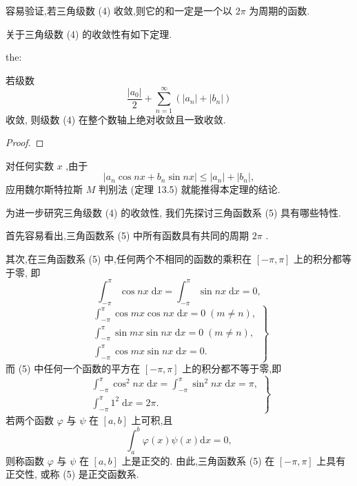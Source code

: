 容易验证,若三角级数 (4) 收敛,则它的和一定是一个以 \({2\pi }\) 为周期的函数.

关于三角级数 (4) 的收敛性有如下定理.

\begin{theorem}{}{the:}

\end{theorem}
 若级数
\[
\frac{\left| {a}_{0}\right| }{2} + \mathop{\sum }\limits_{{n = 1}}^{\infty }\left( {\left| {a}_{n}\right|  + \left| {b}_{n}\right| }\right)
\]
收敛, 则级数 (4) 在整个数轴上绝对收敛且一致收敛.

\begin{proof}

\end{proof}
对任何实数 \(x\) ,由于
\[
\left| {{a}_{n}\cos {nx} + {b}_{n}\sin {nx}}\right|  \leq  \left| {a}_{n}\right|  + \left| {b}_{n}\right| ,
\]
应用魏尔斯特拉斯 \(M\) 判别法 (定理 13.5) 就能推得本定理的结论.

为进一步研究三角级数 (4) 的收敛性, 我们先探讨三角函数系 (5) 具有哪些特性.

首先容易看出,三角函数系 (5) 中所有函数具有共同的周期 \({2\pi }\) .

其次,在三角函数系 (5) 中,任何两个不相同的函数的乘积在 \(\left\lbrack  {-\pi ,\pi }\right\rbrack\) 上的积分都等于零, 即
\[
{\int }_{-\pi }^{\pi }\cos {nx}\mathrm{\;d}x = {\int }_{-\pi }^{\pi }\sin {nx}\mathrm{\;d}x = 0, \tag{6}
\]
\[
\left. \begin{array}{l} {\int }_{-\pi }^{\pi }\cos {mx}\cos {nx}\mathrm{\;d}x = 0\;\left( {m \neq  n}\right) , \\  {\int }_{-\pi }^{\pi }\sin {mx}\sin {nx}\mathrm{\;d}x = 0\;\left( {m \neq  n}\right) , \\  {\int }_{-\pi }^{\pi }\cos {mx}\sin {nx}\mathrm{\;d}x = 0. \end{array}\right\}   \tag{7}
\]
而 (5) 中任何一个函数的平方在 \(\left\lbrack  {-\pi ,\pi }\right\rbrack\) 上的积分都不等于零,即
\[
\left. \begin{array}{l} {\int }_{-\pi }^{\pi }{\cos }^{2}{nx}\mathrm{\;d}x = {\int }_{-\pi }^{\pi }{\sin }^{2}{nx}\mathrm{\;d}x = \pi , \\  {\int }_{-\pi }^{\pi }{1}^{2}\mathrm{\;d}x = {2\pi }. \end{array}\right\}   \tag{8}
\]
若两个函数 \(\varphi\) 与 \(\psi\) 在 \(\left\lbrack  {a,b}\right\rbrack\) 上可积,且
\[
{\int }_{a}^{b}\varphi \left( x\right) \psi \left( x\right) \mathrm{d}x = 0,
\]
则称函数 \(\varphi\) 与 \(\psi\) 在 \(\left\lbrack  {a,b}\right\rbrack\) 上是正交的. 由此,三角函数系 (5) 在 \(\left\lbrack  {-\pi ,\pi }\right\rbrack\) 上具有正交性, 或称 (5) 是正交函数系.


